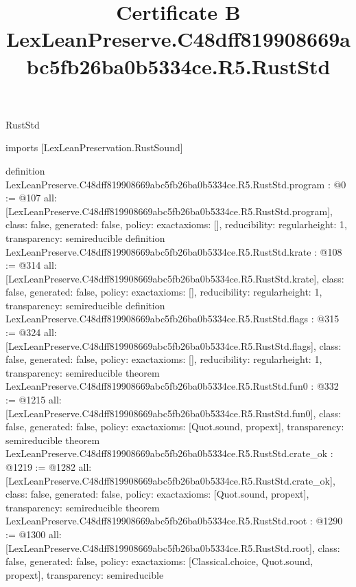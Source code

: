 \begin{lexlean}{RustStd}
\title{Certificate B LexLeanPreserve.C48dff819908669abc5fb26ba0b5334ce.R5.RustStd}
\begin{coremodule}
imports [LexLeanPreservation.RustSound]

definition LexLeanPreserve.C48dff819908669abc5fb26ba0b5334ce.R5.RustStd.program : @0 := @107 {
  all: [LexLeanPreserve.C48dff819908669abc5fb26ba0b5334ce.R5.RustStd.program],
  class: false,
  generated: false,
  policy: exact{axioms: []},
  reducibility: regular{height: 1},
  transparency: semireducible
}
definition LexLeanPreserve.C48dff819908669abc5fb26ba0b5334ce.R5.RustStd.krate : @108 := @314 {
  all: [LexLeanPreserve.C48dff819908669abc5fb26ba0b5334ce.R5.RustStd.krate],
  class: false,
  generated: false,
  policy: exact{axioms: []},
  reducibility: regular{height: 1},
  transparency: semireducible
}
definition LexLeanPreserve.C48dff819908669abc5fb26ba0b5334ce.R5.RustStd.flags : @315 := @324 {
  all: [LexLeanPreserve.C48dff819908669abc5fb26ba0b5334ce.R5.RustStd.flags],
  class: false,
  generated: false,
  policy: exact{axioms: []},
  reducibility: regular{height: 1},
  transparency: semireducible
}
theorem LexLeanPreserve.C48dff819908669abc5fb26ba0b5334ce.R5.RustStd.fun0 : @332 := @1215 {
  all: [LexLeanPreserve.C48dff819908669abc5fb26ba0b5334ce.R5.RustStd.fun0],
  class: false,
  generated: false,
  policy: exact{axioms: [Quot.sound, propext]},
  transparency: semireducible
}
theorem LexLeanPreserve.C48dff819908669abc5fb26ba0b5334ce.R5.RustStd.crate_ok : @1219 := @1282 {
  all: [LexLeanPreserve.C48dff819908669abc5fb26ba0b5334ce.R5.RustStd.crate_ok],
  class: false,
  generated: false,
  policy: exact{axioms: [Quot.sound, propext]},
  transparency: semireducible
}
theorem LexLeanPreserve.C48dff819908669abc5fb26ba0b5334ce.R5.RustStd.root : @1290 := @1300 {
  all: [LexLeanPreserve.C48dff819908669abc5fb26ba0b5334ce.R5.RustStd.root],
  class: false,
  generated: false,
  policy: exact{axioms: [Classical.choice, Quot.sound, propext]},
  transparency: semireducible
}


\end{coremodule}
\end{lexlean}
